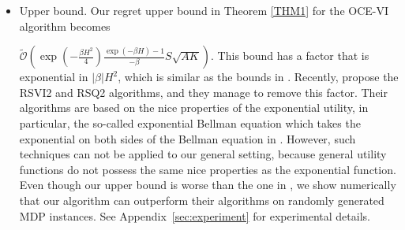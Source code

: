 \documentclass[11pt]{article}
\newcommand{\1}{\mathbbm{1}}
\begin{document}
\begin{itemize}
\item Upper bound. Our regret upper bound in Theorem \ref{THM1} for the OCE-VI algorithm becomes 

$\tilde{\mathcal{O}}\left (\exp(-\frac{\beta H^2}{4})\frac{\exp(-\beta H)-1}{-\beta}S\sqrt{AK}\right )$. 
This bound has a factor that is exponential in $|\beta|H^2$, which is similar as the bounds in \cite{fei2020risk}. Recently, \cite{fei2021exponential} propose the RSVI2 and RSQ2 algorithms, and they manage to remove this factor.
Their algorithms are based on the nice properties of the exponential utility, in particular, the so-called exponential Bellman equation which takes the exponential on both sides of the Bellman equation in \cite{fei2020risk}. However, such techniques can not be applied to our general setting, because general utility functions do not possess the same nice properties as the exponential function. Even though our upper bound is worse than the one in \cite{fei2021exponential}, we show numerically that our algorithm can outperform their algorithms on randomly generated MDP instances. See Appendix~\ref{sec:experiment} for experimental details. 


\end{itemize}
\end{document}
